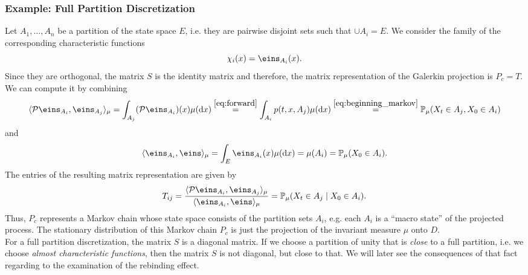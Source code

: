 \subsubsection*{Example: Full Partition Discretization}
Let $A_1, \dots, A_n$ be a partition of the state space $E$, i.e. they are pairwise disjoint sets such that $\cup A_i = E$. We consider the family of the corresponding characteristic functions
\begin{equation*}
\chi_i (x) = \eins_{A_i} (x).
\end{equation*}
Since they are orthogonal, the matrix $S$ is the identity matrix and therefore, the matrix representation of the Galerkin projection is $P_c = T$.
We can compute it by combining
\begin{equation*}
\langle \Pcal \eins_{A_i}, \eins_{A_j} \rangle_\mu = \int_{A_j} (\Pcal \eins_{A_i})(x) \mu(\diff x)
\stackrel{\eqref{eq:forward}}{=}    \int_{A_i} p(t,x,A_j) \mu(\diff x)
\stackrel{\eqref{eq:beginning_markov}}{=}        \Prob_\mu(X_t \in A_j, X_0 \in A_i)
\end{equation*}
and
\begin{equation*}
\langle \eins_{A_i}, \eins \rangle_\mu = \int_E \eins_{A_i} (x) \mu(\diff x) = \mu(A_i)
= \Prob_\mu (X_0 \in A_i).
\end{equation*}
The entries of the resulting matrix representation are given by
\begin{equation*}
T_{ij} = \frac{\langle \Pcal \eins_{A_i}, \eins_{A_j} \rangle_\mu}{\langle \eins_{A_i}, \eins \rangle_\mu}
= \Prob_\mu(X_t \in A_j \mid X_0 \in A_i).
\end{equation*}
Thus, $P_c$ represents a Markov chain whose state space consists of the partition sets $A_i$, e.g. each $A_i$ is a ``macro state'' of the projected process.
The stationary distribution of this Markov chain $P_c$ is just the projection of the invariant measure $\mu$ onto $D$.
\\

For a full partition discretization, the matrix $S$ is a diagonal matrix. If we choose a partition of unity that is \textit{close} to a full partition, i.e. we choose \textit{almost characteristic functions}, then the matrix $S$ is not diagonal, but close to that. We will later see the consequences of that fact regarding to the examination of the rebinding effect.

